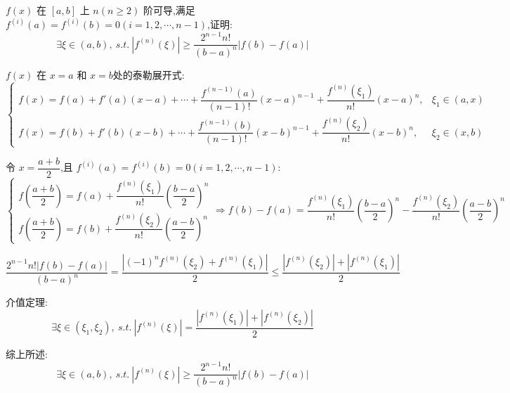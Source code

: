 \begin{proposition}
	$f(x)$ 在 $[a,b]$ 上 $n(n\geq 2)$ 阶可导,满足 $f^{(i)}(a)=f^{(i)}(b)=0(i=1,2,\cdots,n-1)$,证明: 
	$$\exists \xi\in(a,b),\ s.t.\ |f^{(n)}(\xi)|\geq \dfrac{2^{n-1}n!}{(b-a)^n}|f(b)-f(a)|$$
\end{proposition}
\begin{solution}

	$f(x)$ 在 $x=a$ 和 $x=b$处的泰勒展开式:
	$$\begin{cases}
		f(x) = f(a)+f'(a)(x-a)+\cdots+\dfrac{f^{(n-1)}(a)}{(n-1)!}(x-a)^{n-1}+\dfrac{f^{(n)}(\xi_{1})}{n!}(x-a)^n, & \xi_{1}\in (a,x) \\
		f(x) = f(b)+f'(b)(x-b)+\cdots+\dfrac{f^{(n-1)}(b)}{(n-1)!}(x-b)^{n-1}+\dfrac{f^{(n)}(\xi_{2})}{n!}(x-b)^n, & \xi_{2}\in (x,b)
	\end{cases}$$

	令 $x=\dfrac{a+b}{2}$,且 $f^{(i)}(a)=f^{(i)}(b)=0(i=1,2,\cdots,n-1)$:
	$$\begin{cases}
		f(\dfrac{a+b}{2}) = f(a)+\dfrac{f^{(n)}(\xi_{1})}{n!}(\dfrac{b-a}{2})^n \\
		f(\dfrac{a+b}{2}) = f(b)+\dfrac{f^{(n)}(\xi_{2})}{n!}(\dfrac{a-b}{2})^n
	\end{cases}\Rightarrow f(b)-f(a)=\dfrac{f^{(n)}(\xi_{1})}{n!}(\dfrac{b-a}{2})^n-\dfrac{f^{(n)}(\xi_{2})}{n!}(\frac{a-b}{2})^n$$

	$$\dfrac{2^{n-1}n!|f(b)-f(a)|}{(b-a)^n}=\dfrac{|(-1)^nf^{(n)}(\xi_{2})+f^{(n)}(\xi_{1})|}{2}\leq \dfrac{|f^{(n)}(\xi_{2})|+|f^{(n)}(\xi_{1})|}{2}$$

	介值定理:
	$$\exists\xi\in(\xi_{1},\xi_{2}),\ s.t.\ |f^{(n)}(\xi)|=\dfrac{|f^{(n)}(\xi_{1})|+|f^{(n)}(\xi_{2})|}{2}$$

	综上所述:
	$$\exists \xi\in(a,b),\ s.t.\ |f^{(n)}(\xi)|\geq \dfrac{2^{n-1}n!}{(b-a)^n}|f(b)-f(a)|$$
\end{solution}

